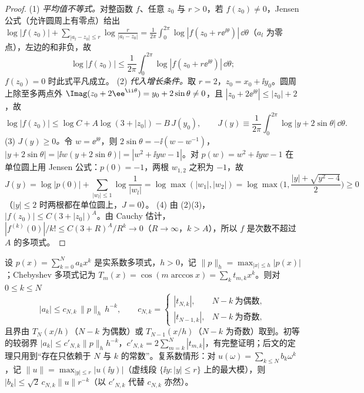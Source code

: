 \begin{proof}
(1) \emph{平均值不等式。}对整函数 $f$、任意 $z_0$ 与 $r>0$，若 $f(z_0)\ne0$，Jensen 公式（允许圆周上有零点）\cite[第~15.16--15.20~节]{Rudin1987}给出
$\log|f(z_0)|+\sum_{|a_l-z_0|\le r}\log\frac{r}{|a_l-z_0|}=\frac1{2\pi}\int_0^{2\pi}\log|f(z_0+r\ee^{\ii\theta})|\,\dd\theta$（$a_l$ 为零点），左边的和非负，故
\[
\log|f(z_0)|\le\frac1{2\pi}\int_0^{2\pi}\log|f(z_0+r\ee^{\ii\theta})|\,\dd\theta ;
\]
$f(z_0)=0$ 时此式平凡成立。
(2) \emph{代入增长条件。}取 $r=2$，$z_0=x_0+\ii y_0$。圆周上除至多两点外 $\Imag(z_0+2\ee^{\ii\theta})=y_0+2\sin\theta\ne0$，且 $|z_0+2\ee^{\ii\theta}|\le|z_0|+2$，故
\[
\log|f(z_0)|\le\log C+A\log(3+|z_0|)-B\,J(y_0),\qquad J(y)\equiv\frac1{2\pi}\int_0^{2\pi}\log|y+2\sin\theta|\,\dd\theta .
\]
(3) \emph{$J(y)\ge0$。}令 $w=\ee^{\ii\theta}$，则 $2\sin\theta=-\ii(w-w^{-1})$，$|y+2\sin\theta|=|\ii w(y+2\sin\theta)|=|w^2+\ii yw-1|$。对 $p(w)=w^2+\ii yw-1$ 在单位圆上用 Jensen 公式：$p(0)=-1$，两根 $w_{1,2}$ 之积为 $-1$，故
\[
J(y)=\log|p(0)|+\sum_{|w_l|\le1}\log\frac1{|w_l|}=\log\max(|w_1|,|w_2|)=\log\max\Big(1,\frac{|y|+\sqrt{y^2-4}}{2}\Big)\ge0
\]
（$|y|\le2$ 时两根都在单位圆上，$J=0$）。
(4) 由 (2)(3)，$|f(z_0)|\le C(3+|z_0|)^A$。由 Cauchy 估计，$|f^{(k)}(0)|/k!\le C(3+R)^A/R^k\to0$（$R\to\infty$，$k>A$），所以 $f$ 是次数不超过 $A$ 的多项式。
\end{proof}

\begin{lemma}\label{lem:appK-markov}
设 $p(x)=\sum_{k=0}^Na_kx^k$ 是实系数多项式，$h>0$，记 $\|p\|_h=\max_{|x|\le h}|p(x)|$；Chebyshev 多项式记为 $T_m(x)=\cos(m\arccos x)=\sum_kt_{m,k}x^k$。则对 $0\le k\le N$
\begin{equation}\label{eq:appK-markov}
|a_k|\le c_{N,k}\,\|p\|_h\,h^{-k},\qquad
c_{N,k}=\begin{cases}|t_{N,k}|,& N-k\ \text{为偶数},\\ |t_{N-1,k}|,& N-k\ \text{为奇数},\end{cases}
\end{equation}
且界由 $T_N(x/h)$（$N-k$ 为偶数）或 $T_{N-1}(x/h)$（$N-k$ 为奇数）取到。初等的较弱界 $|a_k|\le c'_{N,k}\|p\|_hh^{-k}$，$c'_{N,k}=2\sum_{m=k}^N|t_{m,k}|$，有完整证明；后文的定理只用到“存在只依赖于 $N$ 与 $k$ 的常数”。复系数情形：对 $u(\omega)=\sum_{k\le N}b_k\omega^k$，记 $\|u\|=\max_{|y|\le r}|u(\ii y)|$（虚线段 $\{\ii y:|y|\le r\}$ 上的最大模），则 $|b_k|\le\sqrt2\,c_{N,k}\|u\|r^{-k}$（以 $c'_{N,k}$ 代替 $c_{N,k}$ 亦然）。
\end{lemma}

